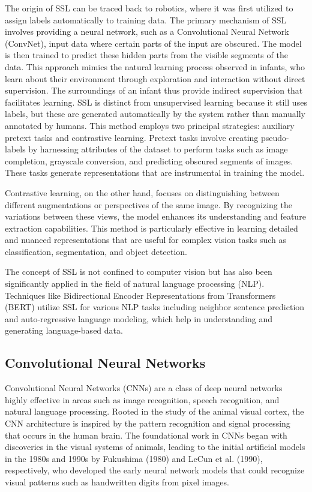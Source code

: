 \documentclass[a4paper,12pt]{article}
\begin{document}
The origin of SSL can be traced back to robotics, where it was first utilized to assign labels automatically to training data. The primary mechanism of SSL involves providing a neural network, such as a Convolutional Neural Network (ConvNet), input data where certain parts of the input are obscured. The model is then trained to predict these hidden parts from the visible segments of the data. This approach mimics the natural learning process observed in infants, who learn about their environment through exploration and interaction without direct supervision. The surroundings of an infant thus provide indirect supervision that facilitates learning. SSL is distinct from unsupervised learning because it still uses labels, but these are generated automatically by the system rather than manually annotated by humans. This method employs two principal strategies: auxiliary pretext tasks and contrastive learning. Pretext tasks involve creating pseudo-labels by harnessing attributes of the dataset to perform tasks such as image completion, grayscale conversion, and predicting obscured segments of images. These tasks generate representations that are instrumental in training the model.

Contrastive learning, on the other hand, focuses on distinguishing between different augmentations or perspectives of the same image. By recognizing the variations between these views, the model enhances its understanding and feature extraction capabilities. This method is particularly effective in learning detailed and nuanced representations that are useful for complex vision tasks such as classification, segmentation, and object detection.

The concept of SSL is not confined to computer vision but has also been significantly applied in the field of natural language processing (NLP). Techniques like Bidirectional Encoder Representations from Transformers (BERT) utilize SSL for various NLP tasks including neighbor sentence prediction and auto-regressive language modeling, which help in understanding and generating language-based data.

\subsection{Convolutional Neural Networks}
Convolutional Neural Networks (CNNs) are a class of deep neural networks highly effective in areas such as image recognition, speech recognition, and natural language processing. Rooted in the study of the animal visual cortex, the CNN architecture is inspired by the pattern recognition and signal processing that occurs in the human brain. The foundational work in CNNs began with discoveries in the visual systems of animals, leading to the initial artificial models in the 1980s and 1990s by Fukushima (1980) and LeCun et al. (1990), respectively, who developed the early neural network models that could recognize visual patterns such as handwritten digits from pixel images.
\end{document}
